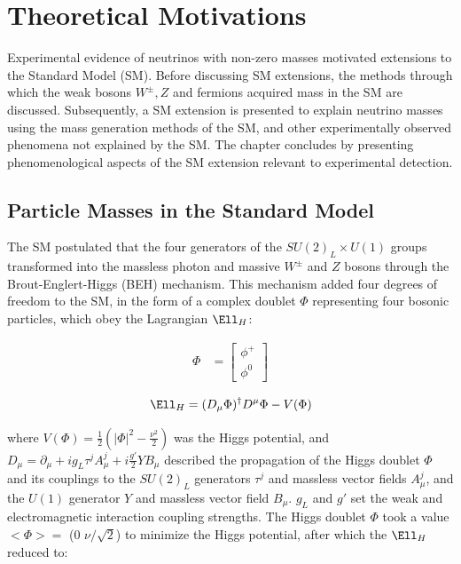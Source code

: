 \chapter{Theoretical Motivations}
\label{wrBosonAndHeavyNu}
Experimental evidence \cite{NOvAresults,mainzPhaseIIResults,t2kResults} of neutrinos with non-zero masses motivated extensions to the Standard Model (SM).  
Before discussing SM extensions, the methods through which the weak bosons $W^{\pm},Z$ and fermions acquired mass 
in the SM are discussed.  Subsequently, a SM extension is presented to explain neutrino masses using the 
mass generation methods of the SM, and other experimentally observed phenomena not explained by the SM.  
The chapter concludes by presenting phenomenological aspects of the SM extension relevant to experimental 
detection.

\section{Particle Masses in the Standard Model}
\label{sec:massInSM}
The SM postulated that the four generators of the $SU(2)_{L} \times U(1)$ groups transformed into the massless 
photon and massive $W^{\pm}$ and $Z$ bosons through the Brout-Englert-Higgs (BEH) mechanism.  This mechanism 
added four degrees of freedom to the SM, in the form of a complex doublet $\Phi$ representing four bosonic 
particles, which obey the Lagrangian $\Ell_{H}$:

\begin{align}
	\Phi &= \begin{bmatrix}
	\phi^{+} \\
	\phi^{0}
	\end{bmatrix}
\end{align}

\begin{equation}
	\Ell_{H} = (D_{\mu}\Phi)^{\dagger}D^{\mu}\Phi - V(\Phi)
\end{equation}

where $V(\Phi) = \frac{1}{2}(|\Phi|^{2} - \frac{\nu^{2}}{2})$ was the Higgs potential, and 
$D_{\mu} = \partial_{\mu} + ig_{L}\tau^{j}A^{j}_{\mu} + i\frac{g'}{2}YB_{\mu}$ described the propagation 
of the Higgs doublet $\Phi$ and its couplings to the $SU(2)_L$ generators $\tau^{j}$ and massless vector 
fields $A^{j}_{\mu}$, and the $U(1)$ generator $Y$ and massless vector field $B_{\mu}$.  $g_{L}$ and 
$g'$ set the weak and electromagnetic interaction coupling strengths.  The Higgs doublet $\Phi$ took a 
value $<\Phi> =$ (0  $\nu/\sqrt{2}$) to minimize the Higgs potential, after which the $\Ell_{H}$ reduced 
to:

